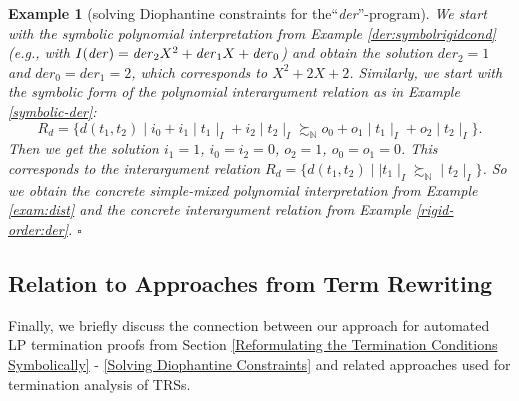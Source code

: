 \documentclass[envcountsame]{tlp}
\newcounter{ex:der-lastsymconsctr}
\newtheorem{example}{Example}
\begin{document}
\begin{example}[solving Diophantine constraints for the``\textit{der}''-program]
\label{der:diocondsolving}
We start with the symbolic polynomial interpretation
from Example \ref{der:symbolrigidcond} (e.g., with
$I(\mathit{der})\linebreak = \mathit{der}_2 X^2+\mathit{der}_1 X+\mathit{der}_0$) 
and obtain the solution $\mathit{der}_2 = 1$ and $\mathit{der}_0 =
\mathit{der}_1 = 2$, 
which corresponds to
$X^2+ 2 X+2$. Similarly, we
start with the symbolic form of the polynomial interargument relation as in
Example \ref{symbolic-der}:
\begin{equation*}
    R_{d} = \{d(t_1,t_2) \mid i_0 + i_1{\mid}t_1{\mid}_I
+i_2{\mid}t_2{\mid}_I \succsim_\mathbb{N} o_0 +
o_1{\mid}t_1{\mid}_I +
o_2{\mid}t_2{\mid}_I\}.
\end{equation*}
Then we get the solution $i_1 = 1$, $i_0 = i_2 = 0$, $o_2 = 1$, $o_0 = o_1
= 0$.
This corresponds to the interargument relation
$R_{d} = \{d(t_1,t_2) \mid {\mid}t_1{\mid}_I
\succsim_\mathbb{N}
{\mid}t_2{\mid}_I\}$.
So we obtain the concrete simple-mixed polynomial interpretation from Example
\ref{exam:dist} and the concrete interargument relation from Example \ref{rigid-order:der}.
\hfill{$\square$}
\end{example}




\subsection{Relation to Approaches from Term Rewriting}
\label{Discussion}

Finally, we briefly discuss the connection between our approach for automated
LP termination proofs  from Section \ref{Reformulating 
the Termination Conditions Symbolically} - \ref{Solving Diophantine Constraints} and related approaches used for
termination analysis of TRSs.
\end{document}
